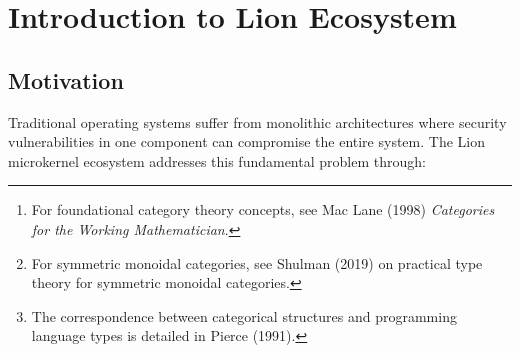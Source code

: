 

\vspace{0.5cm}

\begin{abstract}
This chapter establishes the mathematical foundations for the Lion microkernel ecosystem through category theory\footnote{For foundational category theory concepts, see Mac Lane (1998) \emph{Categories for the Working Mathematician}.}. We present the Lion system as a symmetric monoidal category with formally verified security properties. The categorical framework enables compositional reasoning about security, isolation, and correctness while providing direct correspondence to the Rust implementation.

\vspace{0.5cm}

\textbf{Key Contributions:}
\begin{enumerate}
\item \textbf{Categorical Model}: Lion ecosystem as symmetric monoidal category $\LionComp$\footnote{For symmetric monoidal categories, see Shulman (2019) on practical type theory for symmetric monoidal categories.}
\item \textbf{Security Composition}: Formal proof that security properties compose
\item \textbf{Implementation Correspondence}: Direct mapping from category theory to Rust types\footnote{The correspondence between categorical structures and programming language types is detailed in Pierce (1991).}
\item \textbf{Verification Framework}: Mathematical foundation for end-to-end verification
\end{enumerate}
\end{abstract}

\vspace{0.5cm}

\tableofcontents

\newpage

\section{Introduction to Lion Ecosystem}

\subsection{Motivation}

Traditional operating systems suffer from monolithic architectures where security vulnerabilities in one component can compromise the entire system. The Lion microkernel ecosystem addresses this fundamental problem through:

